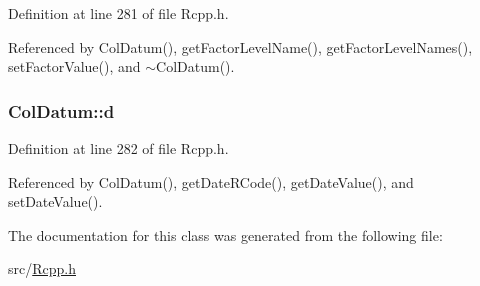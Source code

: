 Definition at line 281 of file Rcpp.h.

Referenced by ColDatum(), getFactorLevelName(), getFactorLevelNames(), setFactorValue(), and $\sim$ColDatum().\hypertarget{classColDatum_01a9fd53a56cf0cafa9c3230a3185c8c}{
\subsubsection[d]{ {\bf ColDatum::d}}}
\label{classColDatum_01a9fd53a56cf0cafa9c3230a3185c8c}




Definition at line 282 of file Rcpp.h.

Referenced by ColDatum(), getDateRCode(), getDateValue(), and setDateValue().

The documentation for this class was generated from the following file:\begin{CompactItemize}
\item 
src/\hyperlink{Rcpp_8h}{Rcpp.h}\end{CompactItemize}
